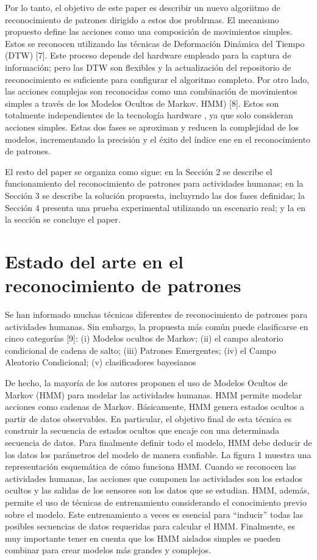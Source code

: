\documentclass{article}
\begin{document}
  Por lo tanto, el objetivo de este paper es describir un nuevo algoriitmo de reconocimiento de patrones dirigido a estos dos problrmas. El mecanismo propuesto define las acciones como una composición de movimientos simples. Estos se reconocen utilizando las técnicas de Deformación Dinámica del Tiempo (DTW) [7]. Este proceso depende del hardware empleado para la captura de información; pero las DTW son flexibles y la actualización del repositorio de reconocimiento es suficiente para configurar el algoritmo completo. Por otro lado, las acciones complejas son reconocidas como una combinación de movimientos simples a través de los Modelos Ocultos de Markov. HMM) [8]. Estos son totalmente independientes de la tecnología hardware , ya que solo consideran acciones simples. Estas dos fases  se aproximan y reducen la complejidad de los modelos, incrementando la precisión y el éxito del índice ene en el reconocimiento de patrones.

  El resto del paper se organiza como sigue: en la Sección 2 se describe el funcionamiento del reconocimiento de patrones para actividades humanas; en la Sección 3 se describe la solución propuesta, incluyrndo las dos fases definidas; la Sección 4 presenta una prueba  experimental utilizando un escenario real; y la en la sección se concluye el paper.
\section {Estado del arte en el reconocimiento de patrones }

  Se han informado muchas técnicas diferentes de reconocimiento de patrones para actividades humanas. Sin embargo, la propuesta más común puede clasificarse en cinco
categorías [9]:
(i) Modelos ocultos de Markov;
(ii) el campo aleatorio condicional de cadena de salto;
(iii) Patrones Emergentes;
(iv) el Campo Aleatorio Condicional;
(v) clasificadores bayesianos

  De hecho, la mayoría de los autores proponen el uso de Modelos Ocultos de Markov (HMM) para modelar las actividades humanas. HMM permite modelar acciones como cadenas de Markov. Básicamente, HMM genera estados ocultos a partir de datos observables. En particular, el objetivo final de esta técnica es construir la secuencia de estados ocultos que encaje con una determinada secuencia de datos. Para finalmente definir todo el modelo, HMM debe deducir de los datos los parámetros del modelo de manera confiable. La figura 1 muestra una representación esquemática de cómo funciona HMM. Cuando se reconocen las actividades humanas, las acciones que componen las actividades son los estados ocultos y las salidas de los sensores son los datos que se estudian. HMM, además, permite el uso de técnicas de entrenamiento considerando el conocimiento previo sobre el modelo. Este entrenamiento a veces es esencial para “inducir” todas las posibles secuencias de datos requeridas para calcular el HMM. Finalmente, es muy importante tener en cuenta que los HMM aislados simples se pueden combinar para crear modelos más grandes y complejos.
\end{document}
